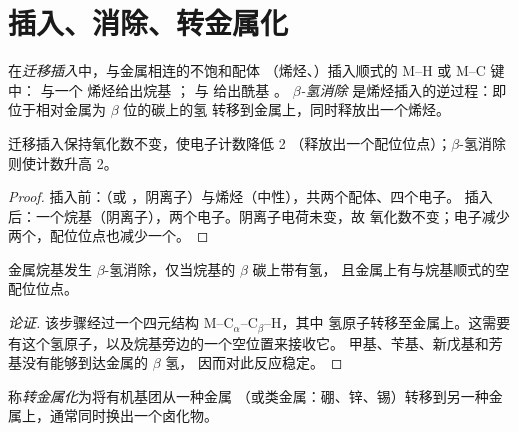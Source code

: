 \section{插入、消除、转金属化}

\begin{definition}\label{def:b2:catalytic-cycles:insertion}
在\emph{迁移插入}中，与金属相连的不饱和配体
（烯烃、）插入顺式的 M--H 或 M--C 键中： 与一个
烯烃给出烷基 ； 与  给出酰基 。
\emph{$\beta$-氢消除}
是烯烃插入的逆过程：即位于相对金属为 $\beta$ 位的碳上的氢
转移到金属上，同时释放出一个烯烃。
\end{definition}

\begin{proposition}[插入的计数]\label{prop:b2:catalytic-cycles:insertion}
迁移插入保持氧化数不变，使电子计数降低 2
（释放出一个配位位点）；$\beta$-氢消除则使计数升高 2。
\end{proposition}

\begin{proof}
插入前：（或 ，阴离子）与烯烃（中性），共两个配体、四个电子。
插入后：一个烷基（阴离子），两个电子。阴离子电荷未变，故
氧化数不变；电子减少两个，配位位点也减少一个。
\end{proof}

\begin{proposition}\label{prop:b2:catalytic-cycles:beta-h}
金属烷基发生 $\beta$-氢消除，仅当烷基的 $\beta$ 碳上带有氢，
且金属上有与烷基顺式的空配位位点。
\end{proposition}

\begin{proof}[论证]
该步骤经过一个四元结构 M--C$_\alpha$--C$_\beta$--H，其中
氢原子转移至金属上。这需要有这个氢原子，以及烷基旁边的一个空位置来接收它。
甲基、苄基、新戊基和芳基没有能够到达金属的 $\beta$ 氢，
因而对此反应稳定。
\end{proof}

\begin{definition}[转金属化]\label{def:b2:catalytic-cycles:transmetalation}
称\emph{转金属化}为将有机基团从一种金属
（或类金属：硼、锌、锡）转移到另一种金属上，通常同时换出一个卤化物。
\end{definition}

